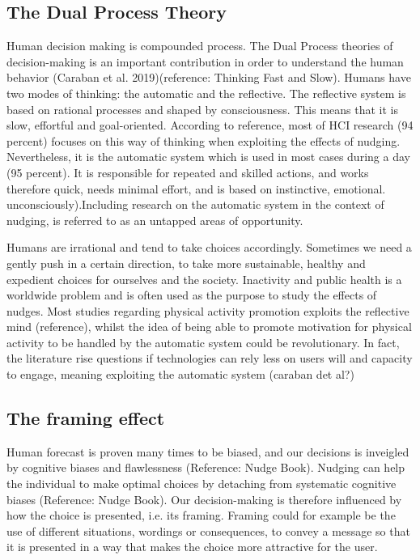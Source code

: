 \subsection{The Dual Process Theory}
Human decision making is compounded process. The Dual Process theories of decision-making is an important contribution in order to understand the human behavior (Caraban et al. 2019)(reference:  Thinking Fast and Slow). Humans have two modes of thinking: the automatic and the reflective. The reflective system is based on rational processes and shaped by consciousness. This means that it is slow, effortful and goal-oriented. According to reference, most of HCI research (94 percent) focuses on this way of thinking when exploiting the effects of nudging. Nevertheless, it is the automatic system which is used in most cases during a day (95 percent). It is responsible for repeated and skilled actions, and works therefore quick, needs minimal effort, and is based on instinctive, emotional.  unconsciously).Including research on the automatic system in the context of nudging, is referred to as an untapped areas of opportunity.

Humans are irrational and tend to take choices accordingly. Sometimes we need
a gently push in a certain direction, to take more sustainable, healthy and expedient choices for ourselves and the society. Inactivity and public health is a worldwide problem  and  is  often  used  as  the  purpose  to  study  the  effects  of  nudges.   Most  studies regarding physical activity promotion exploits the reflective mind (reference), whilst the idea of being able to promote motivation for physical activity to be handled by the automatic system could be revolutionary. In fact, the literature rise questions if technologies can rely less on users will and capacity to engage, meaning exploiting the automatic system (caraban det al?) 

\subsection{The framing effect}
Human forecast is proven many times to be biased, and our decisions is inveigled by cognitive biases and flawlessness  \cite{thaler_nudge-_2009}(Reference: Nudge Book). Nudging can help the individual to make optimal choices by detaching from systematic cognitive biases (Reference: Nudge Book). Our decision-making is therefore influenced by how the choice is presented, i.e. its framing. Framing could for example be the use of different situations, wordings or consequences, to convey a message so that it is presented in a way that makes the choice more attractive for the user. 

